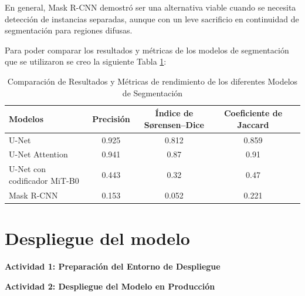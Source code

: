 \begin{enumerate}
\begin{itemize}
  
  \end{itemize}
  
  \vspace{0.2cm}
  En general, Mask R-CNN demostró ser una alternativa viable cuando se necesita detección de instancias separadas, aunque con un leve sacrificio en continuidad de segmentación para regiones difusas.
  


\end{enumerate}

Para poder comparar los resultados y métricas de los modelos de segmentación que se utilizaron se creo la siguiente Tabla \ref{tab:result_models}:
\begin{table}[H]
  \centering
  \caption{Comparación de Resultados y Métricas de rendimiento de los diferentes Modelos de Segmentación}
  \renewcommand{\arraystretch}{1.2} %
  \setlength{\tabcolsep}{5pt} %
  \begin{tabularx}{\textwidth}{@{}X c c c c@{}}
      \toprule
      \textbf{Modelos} & \textbf{Precisión} & \textbf{Índice de Sørensen–Dice} & \textbf{Coeficiente de Jaccard} \\ \midrule
      U-Net & 0.925 & 0.812 & 0.859  \\
      U-Net Attention & 0.941 & 0.87 & 0.91  \\
      U-Net con codificador MiT-B0 & 0.443 & 0.32 & 0.47  \\
      Mask R-CNN & 0.153 & 0.052 & 0.221  \\ 
      \bottomrule
  \end{tabularx}
  \label{tab:result_models}
\end{table}




\section{Despliegue del modelo}
\textbf{Actividad 1: Preparación del Entorno de Despliegue}

\textbf{Actividad 2: Despliegue del Modelo en Producción}
